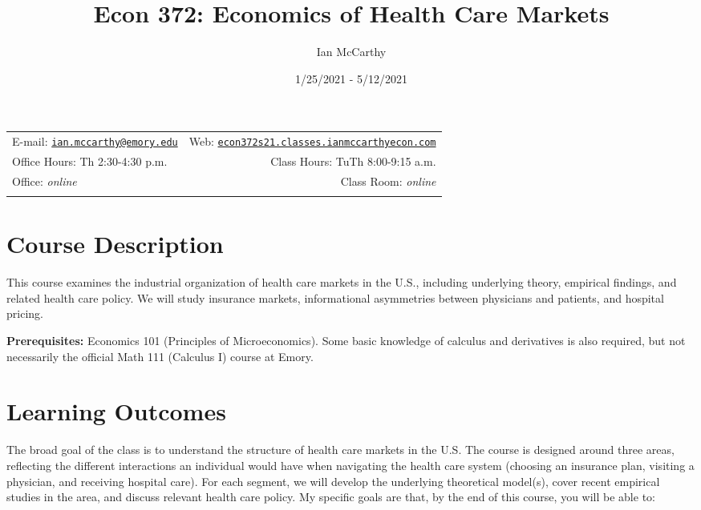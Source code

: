 \documentclass[11pt,]{article}
\title{Econ 372: Economics of Health Care Markets}
\author{Ian McCarthy}
\date{1/25/2021 - 5/12/2021}
\begin{document}
  

		\maketitle
		
	
		\thispagestyle{firststyle}



	\noindent \begin{tabular*}{\textwidth}{ @{\extracolsep{\fill}} lr @{\extracolsep{\fill}}}


E-mail: \texttt{\href{mailto:ian.mccarthy@emory.edu}{\nolinkurl{ian.mccarthy@emory.edu}}} & Web: \href{http://econ372s21.classes.ianmccarthyecon.com}{\tt econ372s21.classes.ianmccarthyecon.com}\\
Office Hours: Th 2:30-4:30 p.m.  &  Class Hours: TuTh 8:00-9:15 a.m.\\
Office: \emph{online}  & Class Room: \emph{online}\\
	&  \\
	\hline
	\end{tabular*}
	
\vspace{2mm}
	


\hypertarget{course-description}{%
\section{Course Description}\label{course-description}}

This course examines the industrial organization of health care markets
in the U.S., including underlying theory, empirical findings, and
related health care policy. We will study insurance markets,
informational asymmetries between physicians and patients, and hospital
pricing.

\textbf{Prerequisites:} Economics 101 (Principles of Microeconomics).
Some basic knowledge of calculus and derivatives is also required, but
not necessarily the official Math 111 (Calculus I) course at Emory.

\hypertarget{learning-outcomes}{%
\section{Learning Outcomes}\label{learning-outcomes}}

The broad goal of the class is to understand the structure of health
care markets in the U.S. The course is designed around three areas,
reflecting the different interactions an individual would have when
navigating the health care system (choosing an insurance plan, visiting
a physician, and receiving hospital care). For each segment, we will
develop the underlying theoretical model(s), cover recent empirical
studies in the area, and discuss relevant health care policy. My
specific goals are that, by the end of this course, you will be able to:
\end{document}
